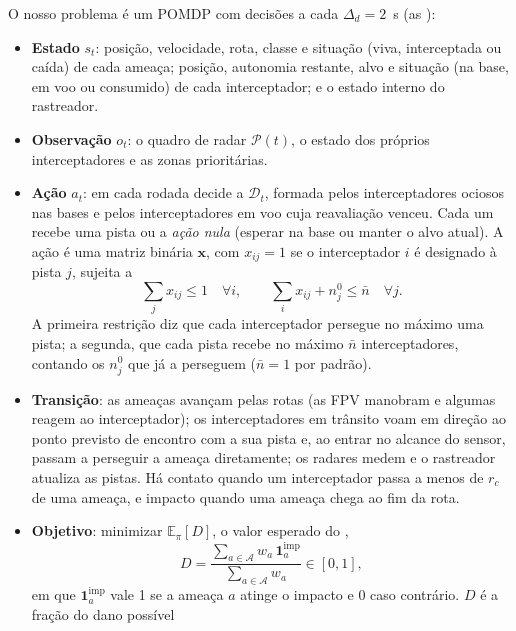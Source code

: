 O nosso problema é um POMDP com decisões a cada $\Delta_d=2$~s (as ):
\begin{itemize}
  \item \textbf{Estado} $s_t$: posição, velocidade, rota, classe e situação (viva, interceptada ou caída) de cada
        ameaça; posição, autonomia restante, alvo e situação (na base, em voo ou consumido) de cada interceptador; e o
        estado interno do rastreador.
  \item \textbf{Observação} $o_t$: o quadro de radar $\mathcal{P}(t)$, o estado dos próprios interceptadores e as zonas
        prioritárias.
  \item \textbf{Ação} $a_t$: em cada rodada decide a  $\mathcal{D}_t$, formada pelos interceptadores ociosos
        nas bases e pelos interceptadores em voo cuja reavaliação venceu. Cada um recebe uma pista ou a \emph{ação nula}
        (esperar na base ou manter o alvo atual). A ação é uma matriz binária $\bm{x}$, com $x_{ij}=1$ se o interceptador
        $i$ é designado à pista $j$, sujeita a
        \begin{equation}
          \sum_j x_{ij}\le1\quad\forall i,\qquad \sum_i x_{ij}+n_j^0\le\bar n\quad\forall j .
          \label{eq:restr}
        \end{equation}
        A primeira restrição diz que cada interceptador persegue no máximo uma pista; a segunda, que cada pista recebe no
        máximo $\bar n$ interceptadores, contando os $n_j^0$ que já a perseguem ($\bar n=1$ por padrão).
  \item \textbf{Transição}: as ameaças avançam pelas rotas (as FPV manobram e algumas reagem ao interceptador); os interceptadores em trânsito voam
        em direção ao ponto previsto de encontro com a sua pista e, ao entrar no alcance do sensor, passam a perseguir a
        ameaça diretamente; os radares medem e o rastreador atualiza as pistas. Há contato quando um interceptador passa
        a menos de $r_c$ de uma ameaça, e impacto quando uma ameaça chega ao fim da rota.
  \item \textbf{Objetivo}: minimizar $\mathbb{E}_\pi[D]$, o valor esperado do ,
        \begin{equation}
          D = \frac{\sum_{a\in\mathcal{A}} w_a\,\mathbf{1}^{\mathrm{imp}}_a}{\sum_{a\in\mathcal{A}} w_a}\in[0,1],
          \label{eq:dano}
        \end{equation}
        em que $\mathbf{1}^{\mathrm{imp}}_a$ vale 1 se a ameaça $a$ atinge o impacto e 0 caso contrário. $D$ é a fração do dano possível

\end{itemize}

